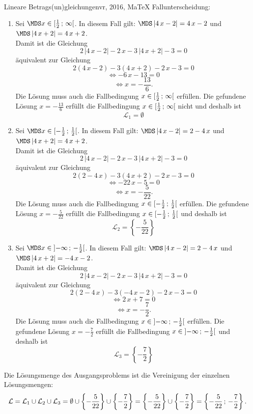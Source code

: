 \begin{MAufgabe}{Lineare Betrags(un)gleichungen}{vr, 2016, MaTeX}
 Fallunterscheidung: 

 \begin{enumerate} 
 \item Sei $ \MDS x\in[ \frac{1}{2} \, \MIntvlSep \, \infty\MoIr $. 
 In diesem Fall gilt: 
  $ \MDS \left| 4\, x - 2\right|=4\, x - 2$ und $ \MDS \left| 4\, x + 2\right|=4\, x + 2$. \\ 
 Damit ist die Gleichung 
 $$ 
2\, \left|4\, x - 2\right| - 2\, x - 3\, \left|4\, x + 2\right| - 3= 0
$$
 \"aquivalent zur Gleichung
 $$ 
2\left(4\, x - 2\right)-3\left( 4\, x + 2\right)- 2\, x-3= 0 
$$  
$$ 
 \Leftrightarrow  - 6\, x - 13= 0 
$$  
$$ \Leftrightarrow x = - \frac{13}{6} . 
 $$ 
 Die L\"osung muss auch die Fallbedingung $x\in [ \frac{1}{2} \, ; \, \infty[\mbox{}  $ erf\"ullen. Die gefundene L\"osung $x=- \frac{13}{6}$ erf\"ullt die Fallbedingung  $x\in [ \frac{1}{2} \, ; \, \infty[\mbox{} $ nicht und deshalb ist  $$
 \mathcal{L}_{1}=\emptyset 
 $$ 
\item Sei $ \MDS x\in[ - \frac{1}{2} \, \MIntvlSep \, \frac{1}{2}\MoIr $. 
 In diesem Fall gilt: 
  $ \MDS \left| 4\, x - 2\right|=2 - 4\, x$ und $ \MDS \left| 4\, x + 2\right|=4\, x + 2$. \\ 
 Damit ist die Gleichung 
 $$ 
2\, \left|4\, x - 2\right| - 2\, x - 3\, \left|4\, x + 2\right| - 3= 0
$$
 \"aquivalent zur Gleichung
 $$ 
2\left(2 - 4\, x\right)-3\left( 4\, x + 2\right)- 2\, x-3= 0 
$$  
$$ 
 \Leftrightarrow  - 22\, x - 5= 0 
$$  
$$ \Leftrightarrow x = - \frac{5}{22} . 
 $$ 
 Die L\"osung muss auch die Fallbedingung $x\in [ - \frac{1}{2} \, ; \, \frac{1}{2}[\mbox{}  $ erf\"ullen. Die gefundene L\"osung $x=- \frac{5}{22}$ erf\"ullt die Fallbedingung  $x\in [ - \frac{1}{2} \, ; \, \frac{1}{2}[\mbox{} $ und deshalb ist  $$
 \mathcal{L}_{2}=\left\{- \frac{5}{22}\right\}
 $$ 
\item Sei $ \MDS x\in\MoIl  -\infty \, \MIntvlSep \, - \frac{1}{2}\MoIr $. 
 In diesem Fall gilt: 
  $ \MDS \left| 4\, x - 2\right|=2 - 4\, x$ und $ \MDS \left| 4\, x + 2\right|= - 4\, x - 2$. \\ 
 Damit ist die Gleichung 
 $$ 
2\, \left|4\, x - 2\right| - 2\, x - 3\, \left|4\, x + 2\right| - 3= 0
$$
 \"aquivalent zur Gleichung
 $$ 
2\left(2 - 4\, x\right)-3\left(  - 4\, x - 2\right)- 2\, x-3= 0 
$$  
$$ 
 \Leftrightarrow 2\, x + 7= 0 
$$  
$$ \Leftrightarrow x = - \frac{7}{2} . 
 $$ 
 Die L\"osung muss auch die Fallbedingung $x\in \mbox{}]\mathopen{}  -\infty \, ; \, - \frac{1}{2}[\mbox{}  $ erf\"ullen. Die gefundene L\"osung $x=- \frac{7}{2}$ erf\"ullt die Fallbedingung  $x\in \mbox{}]\mathopen{}  -\infty \, ; \, - \frac{1}{2}[\mbox{} $ und deshalb ist  $$
 \mathcal{L}_{3}=\left\{- \frac{7}{2}\right\}
 $$ 
 \end{enumerate} 
  Die L\"osungsmenge des Ausgangsproblems ist die Vereinigung der einzelnen L\"osungsmengen: 
$$ \mathcal{L} = \mathcal{L}_{1} \cup \mathcal{L}_{2} \cup \mathcal{L}_{3} 
 = \emptyset\cup \left\{- \frac{5}{22}\right\}\cup \left\{- \frac{7}{2}\right\} 
  =\left\{- \frac{5}{22}\right\}\cup\left\{- \frac{7}{2}\right\} 
  = \left\{- \frac{5}{22}\, ; \,- \frac{7}{2}\right\} 
 . $$ 
 

\end{MAufgabe}
